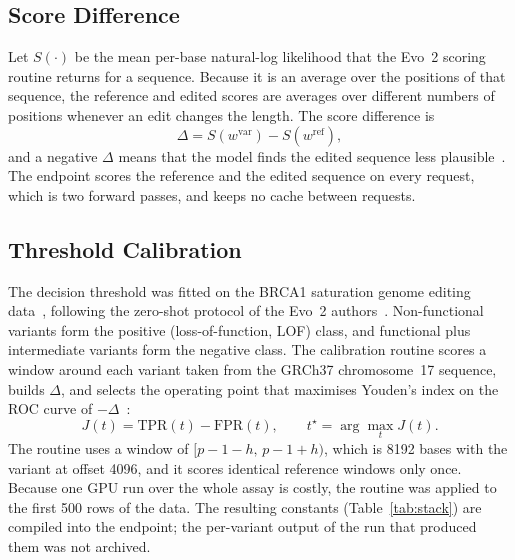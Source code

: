 \documentclass[10pt,journal,a4paper]{IEEEtran}
\begin{document}
\subsection{Score Difference}
Let $S(\cdot)$ be the mean per-base natural-log likelihood that the Evo~2 scoring routine returns for a sequence. Because it is an average over the positions of that sequence, the reference and edited scores are averages over different numbers of positions whenever an edit changes the length. The score difference is
\begin{equation}
\Delta = S(w^{\mathrm{var}}) - S(w^{\mathrm{ref}}),
\label{eq:delta}
\end{equation}
and a negative $\Delta$ means that the model finds the edited sequence less plausible~\cite{brixi2026evo2}. The endpoint scores the reference and the edited sequence on every request, which is two forward passes, and keeps no cache between requests.

\subsection{Threshold Calibration}
The decision threshold was fitted on the BRCA1 saturation genome editing data~\cite{findlay2018brca1}, following the zero-shot protocol of the Evo~2 authors~\cite{brixi2026evo2}. Non-functional variants form the positive (loss-of-function, LOF) class, and functional plus intermediate variants form the negative class. The calibration routine scores a window around each variant taken from the GRCh37 chromosome~17 sequence, builds $\Delta$, and selects the operating point that maximises Youden's index on the ROC curve of $-\Delta$~\cite{hanley1982roc,youden1950index}:
\begin{equation}
J(t)=\mathrm{TPR}(t)-\mathrm{FPR}(t), \qquad t^{\star}=\arg\max_t J(t).
\label{eq:youden}
\end{equation}
The routine uses a window of $[p-1-h,\,p-1+h)$, which is 8192 bases with the variant at offset 4096, and it scores identical reference windows only once. Because one GPU run over the whole assay is costly, the routine was applied to the first 500 rows of the data. The resulting constants (Table~\ref{tab:stack}) are compiled into the endpoint; the per-variant output of the run that produced them was not archived.
\end{document}
